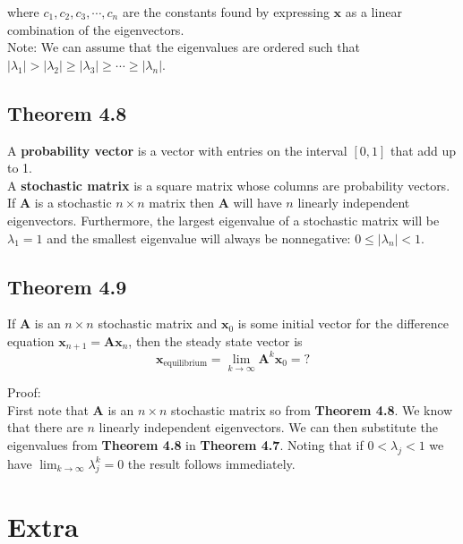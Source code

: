 \documentclass{article}
\begin{document}
\noindent where $c_1,c_2,c_3,\cdots,c_n$ are the constants found by expressing $\boldsymbol{x}$ as a linear combination of the eigenvectors.\\

\noindent Note: We can assume that the eigenvalues are ordered such that $|\lambda_1|>|\lambda_2|\geq|\lambda_3|\geq\cdots\geq|\lambda_n|$.

\subsection*{Theorem 4.8}

A \textbf{probability vector} is a vector with entries on the interval $[0,1]$ that add up to 1.\\

\noindent A \textbf{stochastic matrix} is a square matrix whose columns are probability vectors.\\

\noindent If $\boldsymbol{A}$ is a stochastic $n\times n$ matrix then $\boldsymbol{A}$ will have $n$ linearly independent eigenvectors. Furthermore, the largest eigenvalue of a stochastic matrix will be
$\lambda_1=1$ and the smallest eigenvalue will always be nonnegative: $0\leq|\lambda_n|<1$.\


\subsection*{Theorem 4.9}

If $\boldsymbol{A}$ is an $n\times n$ stochastic matrix and $\boldsymbol{x}_0$  is some initial vector for the difference equation
$\boldsymbol{x}_{n+1}=\boldsymbol{A}\boldsymbol{x}_n$, then the steady state vector is
$$
\boldsymbol{x}_\text{equilibrium}=\lim_{k\to\infty}\boldsymbol{A}^k\boldsymbol{x}_0=?
$$

\noindent Proof:\\

\noindent First note that $\boldsymbol{A}$ is an $n\times n$ stochastic matrix so from \textbf{Theorem 4.8}. We know that there are $n$ linearly independent eigenvectors.
We can then substitute the eigenvalues from \textbf{Theorem 4.8} in \textbf{Theorem 4.7}.
Noting that if $0<\lambda_j<1$ we have $\lim_{k\to\infty}\lambda_j^k=0$ the result follows immediately.

\section{Extra}
\end{document}
